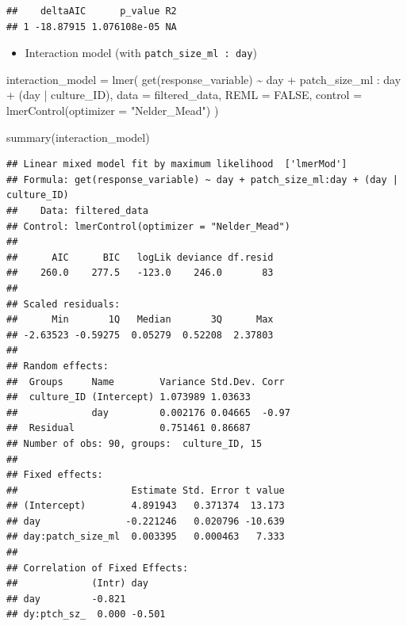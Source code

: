 \documentclass[
]{article}
\newenvironment{Shaded}{\begin{snugshade}}{\end{snugshade}}
\newcommand{\AttributeTok}[1]{\textcolor[rgb]{0.77,0.63,0.00}{#1}}
\newcommand{\ConstantTok}[1]{\textcolor[rgb]{0.00,0.00,0.00}{#1}}
\newcommand{\FunctionTok}[1]{\textcolor[rgb]{0.00,0.00,0.00}{#1}}
\newcommand{\NormalTok}[1]{#1}
\newcommand{\OtherTok}[1]{\textcolor[rgb]{0.56,0.35,0.01}{#1}}
\newcommand{\SpecialCharTok}[1]{\textcolor[rgb]{0.00,0.00,0.00}{#1}}
\newcommand{\StringTok}[1]{\textcolor[rgb]{0.31,0.60,0.02}{#1}}
\providecommand{\tightlist}{%
  \setlength{\itemsep}{0pt}\setlength{\parskip}{0pt}}
\begin{document}
\begin{verbatim}
##    deltaAIC      p_value R2
## 1 -18.87915 1.076108e-05 NA
\end{verbatim}

\begin{itemize}
\tightlist
\item
  Interaction model (with \texttt{patch\_size\_ml\ :\ day})
\end{itemize}

\begin{Shaded}
\begin{Highlighting}[]
\NormalTok{interaction\_model }\OtherTok{=} \FunctionTok{lmer}\NormalTok{(}
  \FunctionTok{get}\NormalTok{(response\_variable) }\SpecialCharTok{\textasciitilde{}}
\NormalTok{    day }\SpecialCharTok{+}
\NormalTok{    patch\_size\_ml }\SpecialCharTok{:}\NormalTok{ day }\SpecialCharTok{+}
\NormalTok{    (day }\SpecialCharTok{|}\NormalTok{ culture\_ID),}
  \AttributeTok{data =}\NormalTok{ filtered\_data,}
  \AttributeTok{REML =} \ConstantTok{FALSE}\NormalTok{,}
  \AttributeTok{control =} \FunctionTok{lmerControl}\NormalTok{(}\AttributeTok{optimizer =} \StringTok{"Nelder\_Mead"}\NormalTok{)}
\NormalTok{)}

\FunctionTok{summary}\NormalTok{(interaction\_model)}
\end{Highlighting}
\end{Shaded}

\begin{verbatim}
## Linear mixed model fit by maximum likelihood  ['lmerMod']
## Formula: get(response_variable) ~ day + patch_size_ml:day + (day | culture_ID)
##    Data: filtered_data
## Control: lmerControl(optimizer = "Nelder_Mead")
## 
##      AIC      BIC   logLik deviance df.resid 
##    260.0    277.5   -123.0    246.0       83 
## 
## Scaled residuals: 
##      Min       1Q   Median       3Q      Max 
## -2.63523 -0.59275  0.05279  0.52208  2.37803 
## 
## Random effects:
##  Groups     Name        Variance Std.Dev. Corr 
##  culture_ID (Intercept) 1.073989 1.03633       
##             day         0.002176 0.04665  -0.97
##  Residual               0.751461 0.86687       
## Number of obs: 90, groups:  culture_ID, 15
## 
## Fixed effects:
##                    Estimate Std. Error t value
## (Intercept)        4.891943   0.371374  13.173
## day               -0.221246   0.020796 -10.639
## day:patch_size_ml  0.003395   0.000463   7.333
## 
## Correlation of Fixed Effects:
##             (Intr) day   
## day         -0.821       
## dy:ptch_sz_  0.000 -0.501
\end{verbatim}
\end{document}
